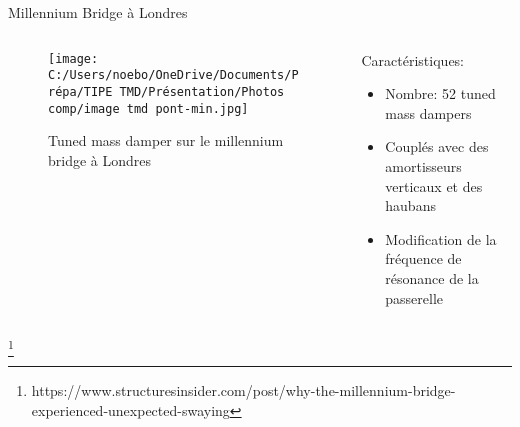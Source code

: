 \documentclass{beamer}
\begin{document}
\begin{frame}{Millennium Bridge à Londres}
	\begin{columns}
		\begin{column}{0.5\textwidth}
			\begin{figure}
				\texttt{[image: C:/Users/noebo/OneDrive/Documents/Prépa/TIPE TMD/Présentation/Photos comp/image tmd pont-min.jpg]}
				\caption{Tuned mass damper sur le millennium bridge à Londres}
			\end{figure}
		\end{column}
		\begin{column}{0.5\textwidth}
			Caractéristiques:
			\begin{itemize}
				\item Nombre: 52 tuned mass dampers
				\item Couplés avec des amortisseurs verticaux et des haubans 
				\item Modification de la fréquence de résonance de la passerelle 
				
				
			\end{itemize}	
		\end{column}
	\end{columns}
	\footnote{\tiny https://www.structuresinsider.com/post/why-the-millennium-bridge-experienced-unexpected-swaying}
\end{frame}
\end{document}
